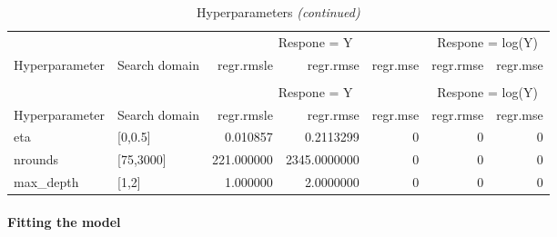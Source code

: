 \documentclass[
]{article}
\begin{document}
\begin{longtable}[t]{llrrrrr}
\caption{\label{tab:unnamed-chunk-20}Hyperparameters}\\
\toprule
\multicolumn{2}{c}{ } & \multicolumn{3}{c}{Respone = Y} & \multicolumn{2}{c}{Respone = log(Y)} \\
\cmidrule(l{3pt}r{3pt}){3-5} \cmidrule(l{3pt}r{3pt}){6-7}
Hyperparameter & Search domain & regr.rmsle & regr.rmse & regr.mse & regr.rmse & regr.mse\\
\midrule
\endfirsthead
\caption[]{Hyperparameters \textit{(continued)}}\\
\toprule
\multicolumn{2}{c}{ } & \multicolumn{3}{c}{Respone = Y} & \multicolumn{2}{c}{Respone = log(Y)} \\
\cmidrule(l{3pt}r{3pt}){3-5} \cmidrule(l{3pt}r{3pt}){6-7}
Hyperparameter & Search domain & regr.rmsle & regr.rmse & regr.mse & regr.rmse & regr.mse\\
\midrule
\endhead

\endfoot
\bottomrule
\endlastfoot
eta & {}[0,0.5] & 0.010857 & 0.2113299 & 0 & 0 & 0\\
nrounds & {}[75,3000] & 221.000000 & 2345.0000000 & 0 & 0 & 0\\
max\_depth & {}[1,2] & 1.000000 & 2.0000000 & 0 & 0 & 0\\*
\end{longtable}

\hypertarget{fitting-the-model}{%
\paragraph{Fitting the model}\label{fitting-the-model}}
\end{document}
